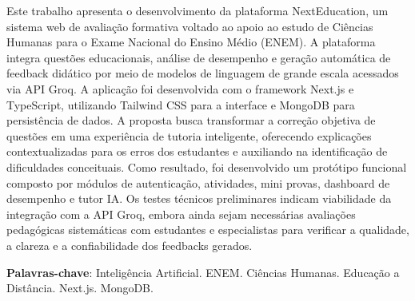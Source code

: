 \documentclass[
12pt,
openright,
oneside,
a4paper,
brazil
]{abntex2}
\begin{document}
\imprimircapa

\imprimirfolhaderosto*



\begin{resumo}

Este trabalho apresenta o desenvolvimento da plataforma NextEducation, um sistema web de avaliação formativa voltado ao apoio ao estudo de Ciências Humanas para o Exame Nacional do Ensino Médio (ENEM). A plataforma integra questões educacionais, análise de desempenho e geração automática de feedback didático por meio de modelos de linguagem de grande escala acessados via API Groq. A aplicação foi desenvolvida com o framework Next.js e TypeScript, utilizando Tailwind CSS para a interface e MongoDB para persistência de dados. A proposta busca transformar a correção objetiva de questões em uma experiência de tutoria inteligente, oferecendo explicações contextualizadas para os erros dos estudantes e auxiliando na identificação de dificuldades conceituais. Como resultado, foi desenvolvido um protótipo funcional composto por módulos de autenticação, atividades, mini provas, dashboard de desempenho e tutor IA. Os testes técnicos preliminares indicam viabilidade da integração com a API Groq, embora ainda sejam necessárias avaliações pedagógicas sistemáticas com estudantes e especialistas para verificar a qualidade, a clareza e a confiabilidade dos feedbacks gerados.

\textbf{Palavras-chave}: Inteligência Artificial. ENEM. Ciências Humanas. Educação a Distância. Next.js. MongoDB.

\end{resumo}

\end{document}
